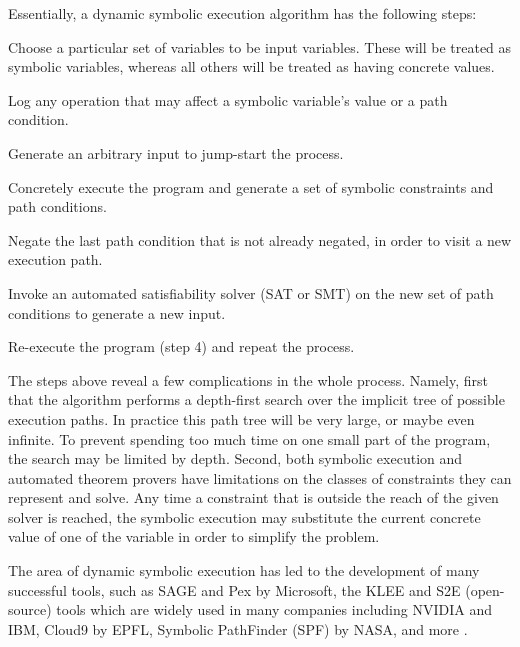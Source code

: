 Essentially, a dynamic symbolic execution algorithm has the following steps:
\begin{compactenum}
\item Choose a particular set of variables to be input variables. These will be treated as symbolic variables, whereas all others will be treated as having concrete values.
\item Log any operation that may affect a symbolic variable's value or a path condition.
\item Generate an arbitrary input to jump-start the process.
\item Concretely execute the program and generate a set of symbolic constraints and path conditions.
\item Negate the last path condition that is not already negated, in order to visit a new execution path.
\item Invoke an automated satisfiability solver (SAT or SMT) on the new set of path conditions to generate a new input.
\item Re-execute the program (step 4) and repeat the process.
\end{compactenum}


The steps above reveal a few complications in the whole process. Namely, first that the algorithm performs a depth-first search over the implicit tree of possible execution paths. In practice this path tree will be very large, or maybe even infinite. To prevent spending too much time on one small part of the program, the search may be limited by depth. Second, both symbolic execution and automated theorem provers have limitations on the classes of constraints they can represent and solve. Any time a constraint that is outside the reach of the given solver is reached, the symbolic execution may substitute the current concrete value of one of the variable in order to simplify the problem.

The area of dynamic symbolic execution has led to the development of many successful tools, such as SAGE and Pex by Microsoft, the KLEE and S2E (open-source) tools which are widely used in many companies including NVIDIA and IBM, Cloud9 by EPFL, Symbolic PathFinder (SPF) by NASA, and more \todo{}.